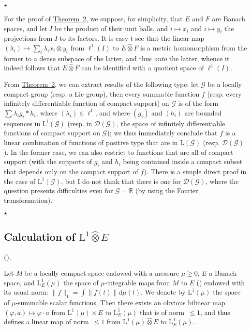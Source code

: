 \documentclass{article}
\theoremstyle{plain}
\newcommand{\aster}[1]{$\star${#1}$\star$}
\newcommand{\LL}{\mathrm{L}}
\renewcommand{\ll}{\ell}
\newcommand{\hotimes}{\widehat{\otimes}}
\newcommand{\scr}{\mathscr}
\newcommand{\dd}{\mathrm{d}}
\newcommand{\oldpage}[1]{\marginpar{\footnotesize$\Big\vert$ \textit{p.~#1}}}
\begin{document}
\aster{%
  For the proof of \hyperref[1.theorem2]{Theorem~2}, we suppose, for simplicity, that $E$ and $F$ are Banach spaces, and let $I$ be the product of their unit balls, and $i\mapsto x_i$ and $i\mapsto y_i$ the projections from $I$ to its factors.
  It is easy t see that the linear map $(\lambda_i)\mapsto\sum_i\lambda_i x_i\otimes y_i$ from $\ll^1(I)$ to $E\hotimes F$ is a metric homomorphism from the former to a dense subspace of the latter, and thus \emph{onto} the latter, whence it indeed follows that $E\hotimes F$ can be identified with a quotient space of $\ll^1(I)$.

  From \hyperref[1.theorem2]{Theorem~2}, we can extract results of the following type:
  let $\scr{G}$ be a
\oldpage{79}
  locally compact group (resp. a Lie group), then every summable function $f$ (resp. every infinitely differentiable function of compact support) on $\scr{G}$ is of the form $\sum\lambda_i g_i*h_i$, where $(\lambda_i)\in\ll^1$, and where $(g_i)$ and $(h_i)$ are bounded sequences in $\LL^i(\scr{G})$ (resp. in $\scr{D}(\scr{G})$, the space of infinitely differentiable functions of compact support on $\scr{G}$);
  we thus immediately conclude that $f$ is a linear combination of functions of positive type that are in $\LL(\scr{G})$ (resp. $\scr{D}(\scr{G})$).
  In the former case, we can also restrict to functions that are all of compact support (with the supports of $g_i$ and $h_i$ being contained inside a compact subset that depends only on the compact support of $f$).
  There is a simple direct proof in the case of $\LL^1(\scr{G})$, but I do not think that there is one for $\scr{D}(\scr{G})$, where the question presents difficulties even for $\scr{G}=\mathbb{R}$ (by using the Fourier transformation).
}


\subsection{Calculation of \texorpdfstring{$\LL^1\hotimes E$}{L1E}}
\label{1.3}

(\cite[chap.~I, \S2, n\textsuperscript{o}~2]{PTT}).
\medskip

Let $M$ be a locally compact space endowed with a measure $\mu\geq0$, $E$ a Banach space, and $\LL_E^1(\mu)$ the space of $\mu$-integrable maps from $M$ to $E$ (\cite{2}) endowed with its usual norm: $\|f\|_1=\int\|f(t)\|\dd\mu(t)$.
We denote by $\LL^1(\mu)$ the space of $\mu$-summable scalar functions.
Then there exists an obvious bilinear map $(\varphi,a)\mapsto\varphi\cdot a$ from $\LL^1(\mu)\times E$ to $\LL_E^1(\mu)$ that is of norm~$\leq1$, and thus defines a linear map of norm~$\leq1$ from $\LL^1(\mu)\hotimes E$ to $\LL_E^1(\mu)$.
\end{document}
